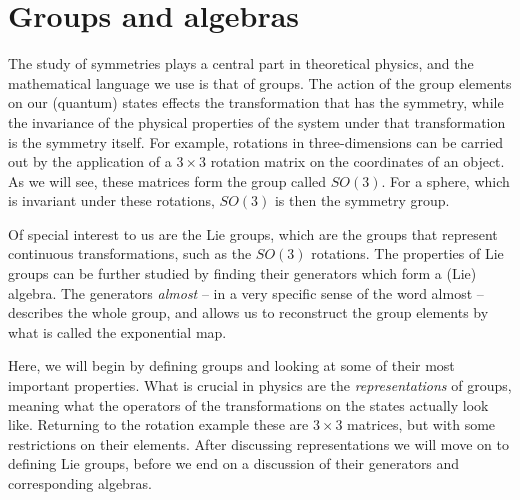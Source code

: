 \documentclass[notes.tex]{subfiles}
\begin{document}
\chapter{Groups and algebras}
\label{chap:groups}

The study of symmetries plays a central part in theoretical physics, and the mathematical language we use is that of groups. The action of the group elements on our (quantum) states effects the transformation that has the symmetry, while the invariance of the physical properties of the system under that transformation is the symmetry itself. For example, rotations in three-dimensions can be carried out by the application of a $3\times3$ rotation matrix on the coordinates of an object. As we will see, these matrices form the group called $SO(3)$. For a sphere, which is invariant under these rotations, $SO(3)$ is then the symmetry group.

Of special interest to us are the Lie groups, which are the groups that represent continuous transformations, such as the $SO(3)$ rotations. The properties of Lie groups can be further studied by finding their generators which form a (Lie) algebra. The generators {\it almost} -- in a very specific sense of the word almost -- describes the whole group, and allows us to reconstruct the group elements by what is called the exponential map.

Here, we will begin by defining groups and looking at some of their most important properties. What is crucial in physics are the {\it representations} of groups, meaning what the operators of the transformations on the states actually look like. Returning to the rotation example these are $3\times3$ matrices, but with some restrictions on their elements. After discussing representations we will move on to defining Lie groups, before we end on a discussion of their generators and corresponding algebras.

\end{document}
